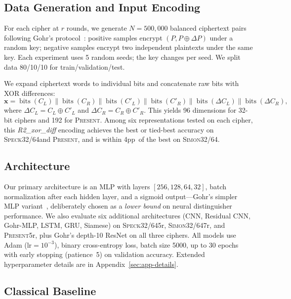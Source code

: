 \documentclass[runningheads]{llncs}
\newcommand{\speck}{\textsc{Speck32/64}}
\newcommand{\simon}{\textsc{Simon32/64}}
\newcommand{\present}{\textsc{Present}}
\newcommand{\pp}{pp}
\begin{document}
\subsection{Data Generation and Input Encoding}

For each cipher at $r$ rounds, we generate $N = 500{,}000$ balanced ciphertext pairs following Gohr's protocol~\cite{gohr2019}: positive samples encrypt $(P, P \oplus \Delta P)$ under a random key; negative samples encrypt two independent plaintexts under the same key.
Each experiment uses 5 random seeds; the key changes per seed.
We split data 80/10/10 for train/validation/test.

We expand ciphertext words to individual bits and concatenate raw bits with XOR differences:
\begin{equation}
\label{eq:repr}
\mathbf{x} = \operatorname{bits}(C_L) \| \operatorname{bits}(C_R) \| \operatorname{bits}(C'_L) \| \operatorname{bits}(C'_R) \| \operatorname{bits}(\Delta C_L) \| \operatorname{bits}(\Delta C_R),
\end{equation}
where $\Delta C_L = C_L \oplus C'_L$ and $\Delta C_R = C_R \oplus C'_R$.
This yields 96 dimensions for 32-bit ciphers and 192 for \present.
Among six representations tested on each cipher, this \emph{R2\_xor\_diff} encoding achieves the best or tied-best accuracy on \speck and \present, and is within 4\pp\ of the best on \simon.

\subsection{Architecture}

Our primary architecture is an MLP with layers $[256, 128, 64, 32]$, batch normalization after each hidden layer, and a sigmoid output---Gohr's simpler MLP variant~\cite{gohr2019}, deliberately chosen as a \emph{lower bound} on neural distinguisher performance.
We also evaluate six additional architectures (CNN, Residual CNN, Gohr-MLP, LSTM, GRU, Siamese) on \speck 5r, \simon 7r, and \present 5r, plus Gohr's depth-10 ResNet on all three ciphers.
All models use Adam ($\text{lr} = 10^{-3}$), binary cross-entropy loss, batch size 5000, up to 30 epochs with early stopping (patience~5) on validation accuracy.
Extended hyperparameter details are in Appendix~\ref{sec:app-details}.

\subsection{Classical Baseline}
\end{document}

